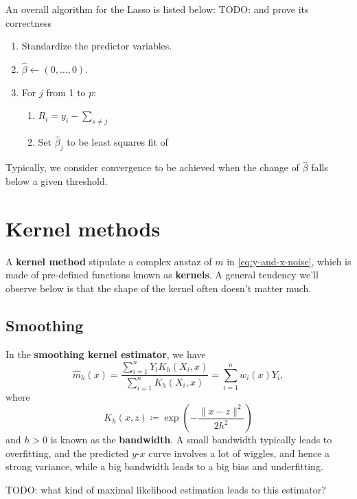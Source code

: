 \documentclass[hyperref, a4paper]{article}
\newcommand*{\concept}[1]{{\textbf{#1}}}
\begin{document}
An overall algorithm for the Lasso is listed below: TODO: and prove its correctness
\begin{enumerate}
    \item Standardize the predictor variables. 
    \item $\hat{\beta} \leftarrow (0, \ldots, 0)$.
    \item For $j$ from 1 to $p$:
    \begin{enumerate}
        \item $R_i = y_i - \sum_{s \neq j}$
        \item Set $\hat{\beta}_j$ to be least squares fit of 
    \end{enumerate}
\end{enumerate}

Typically, we consider convergence to be achieved 
when the change of $\hat{\beta}$ falls below a given threshold.

\section{Kernel methods}

A \concept{kernel method} stipulate a complex anstaz of $m$ in \eqref{eq:y-and-x-noise},
which is made of pre-defined functions known as \concept{kernels}.
A general tendency we'll observe below is that the shape of the kernel often doesn't matter much.

\subsection{Smoothing}

In the \concept{smoothing kernel estimator}, we have 
\begin{equation}
    \hat{m}_h(x)=\frac{\sum_{i=1}^n Y_i K_h\left(X_i, x\right)}{\sum_{i=1}^n K_h\left(X_i, x\right)}=\sum_{i=1}^n w_i(x) Y_i,
\end{equation}
where 
\begin{equation}
    K_h(x, z) \coloneqq \exp \left(-\frac{\|x-z\|^2}{2 h^2}\right)
\end{equation}
and $h > 0$ is known as the \concept{bandwidth}.
A small bandwidth typically leads to overfitting, and the predicted $y$-$x$ curve involves a lot of wiggles,
and hence a strong variance,
while a big bandwidth leads to a big bias and underfitting.

TODO: what kind of maximal likelihood estimation leads to this estimator?
\end{document}
